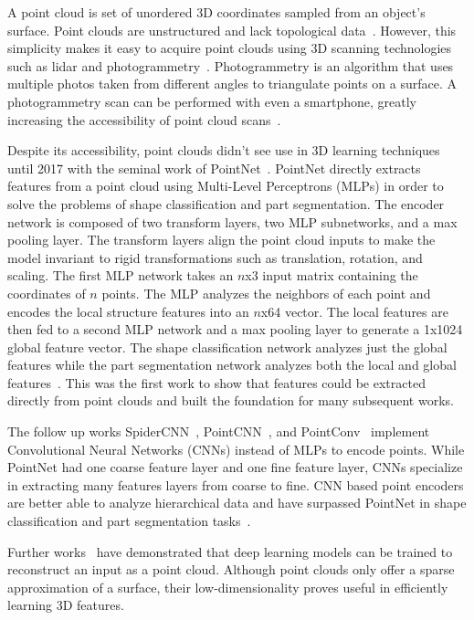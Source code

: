A point cloud is set of unordered 3D coordinates sampled from an object's surface. Point clouds are unstructured and lack topological data~\cite{Xiao2020}. However, this simplicity makes it easy to acquire point clouds using 3D scanning technologies such as lidar and photogrammetry~\cite{Leberl2010}. Photogrammetry is an algorithm that uses multiple photos taken from different angles to triangulate points on a surface. A photogrammetry scan can be performed with even a smartphone, greatly increasing the accessibility of point cloud scans~\cite{Micheletti2015}.

Despite its accessibility, point clouds didn't see use in 3D learning techniques until 2017 with the seminal work of PointNet~\cite{Qi2017}. PointNet directly extracts features from a point cloud using Multi-Level Perceptrons (MLPs) in order to solve the problems of shape classification and part segmentation. The encoder network is composed of two transform layers, two MLP subnetworks, and a max pooling layer. The transform layers align the point cloud inputs to make the model invariant to rigid transformations such as translation, rotation, and scaling. The first MLP network takes an $n$x3 input matrix containing the coordinates of $n$ points. The MLP analyzes the neighbors of each point and encodes the local structure features into an $n$x64 vector. The local features are then fed to a second MLP network and a max pooling layer to generate a 1x1024 global feature vector. The shape classification network analyzes just the global features while the part segmentation network analyzes both the local and global features~\cite{Xiao2020}. This was the first work to show that features could be extracted directly from point clouds and built the foundation for many subsequent works.

The follow up works SpiderCNN~\cite{Xu2018}, PointCNN~\cite{Li2018}, and PointConv~\cite{Wu2019} implement Convolutional Neural Networks (CNNs) instead of MLPs to encode points. While PointNet had one coarse feature layer and one fine feature layer, CNNs specialize in extracting many features layers from coarse to fine. CNN based point encoders are better able to analyze hierarchical data and have surpassed PointNet in shape classification and part segmentation tasks~\cite{Wu2019}.

Further works~\cite{Fan2017, Achlioptas2018} have demonstrated that deep learning models can be trained to reconstruct an input as a point cloud. Although point clouds only offer a sparse approximation of a surface, their low-dimensionality proves useful in efficiently learning 3D features.


